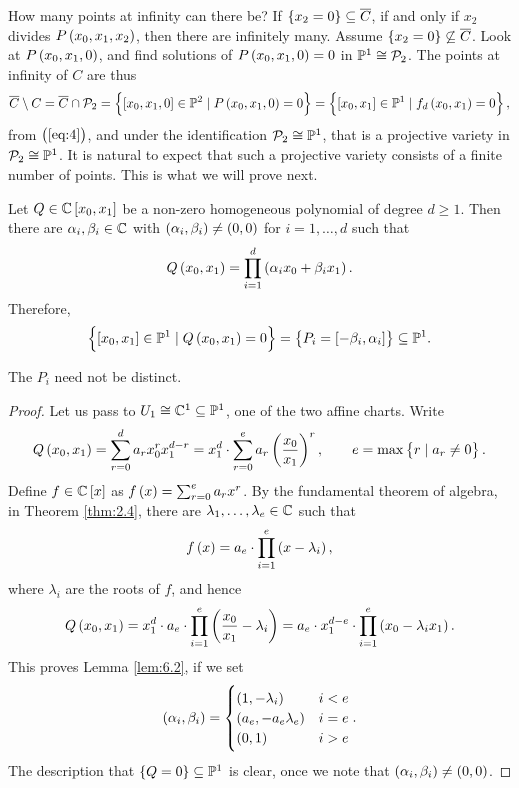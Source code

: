 How many points at infinity can there be? If $ \cbr{x_2 = 0} \subseteq \overline{C} $, if and only if $ x_2 $ divides $ P\br{x_0, x_1, x_2} $, then there are infinitely many. Assume $ \cbr{x_2 = 0} \not\subseteq \overline{C} $. Look at $ P\br{x_0, x_1, 0} $, and find solutions of $ P\br{x_0, x_1, 0} = 0 $ in $ \mathbb{P}^1 \cong \mathcal{P}_2 $. The points at infinity of $ C $ are thus
$$ \overline{C} \setminus C = \overline{C} \cap \PP_2 = \cbr{\sbr{x_0, x_1, 0} \in \P^2 \mid P\br{x_0, x_1, 0} = 0} = \cbr{\sbr{x_0, x_1} \in \P^1 \mid f_d\br{x_0, x_1} = 0}, $$
from $ \br{\ref{eq:4}} $, and under the identification $ \mathcal{P}_2 \cong \mathbb{P}^1 $, that is a projective variety in $ \mathcal{P}_2 \cong \mathbb{P}^1 $. It is natural to expect that such a projective variety consists of a finite number of points. This is what we will prove next.

\begin{lemma}
\label{lem:6.2}
Let $ Q \in \C\sbr{x_0, x_1} $ be a non-zero homogeneous polynomial of degree $ d \ge 1 $. Then there are $ \alpha_i, \beta_i \in \mathbb{C} $ with $ \br{\alpha_i, \beta_i} \ne \br{0, 0} $ for $ i = 1, \dots, d $ such that
$$ Q\br{x_0, x_1} = \prod_{i = 1}^d \br{\alpha_ix_0 + \beta_ix_1}. $$
Therefore,
$$ \cbr{\sbr{x_0, x_1} \in \P^1 \mid Q\br{x_0, x_1} = 0} = \cbr{P_i = \sbr{-\beta_i, \alpha_i}} \subseteq \P^1. $$
\end{lemma}

\begin{note*}
The $ P_i $ need not be distinct.
\end{note*}

\begin{proof}
Let us pass to $ U_1 \cong \mathbb{C}^1 \subseteq \mathbb{P}^1 $, one of the two affine charts. Write
$$ Q\br{x_0, x_1} = \sum_{r = 0}^d a_rx_0^rx_1^{d - r} = x_1^d \cdot \sum_{r = 0}^e a_r\br{\dfrac{x_0}{x_1}}^r, \qquad e = \max\cbr{r \mid a_r \ne 0}. $$
Define $ f \in \C\sbr{x} $ as $ f\br{x} = \sum_{r = 0}^e a_rx^r $. By the fundamental theorem of algebra, in Theorem \ref{thm:2.4}, there are $ \lambda_1, \dots, \lambda_e \in \mathbb{C} $ such that
$$ f\br{x} = a_e \cdot \prod_{i = 1}^e \br{x - \lambda_i}, $$
where $ \lambda_i $ are the roots of $ f $, and hence
$$ Q\br{x_0, x_1} = x_1^d \cdot a_e \cdot \prod_{i = 1}^e \br{\dfrac{x_0}{x_1} - \lambda_i} = a_e \cdot x_1^{d - e} \cdot \prod_{i = 1}^e \br{x_0 - \lambda_ix_1}. $$
This proves Lemma \ref{lem:6.2}, if we set
$$ \br{\alpha_i, \beta_i} =
\begin{cases}
\br{1, -\lambda_i} & i < e \\
\br{a_e, -a_e\lambda_e} & i = e \\
\br{0, 1} & i > e
\end{cases}.
$$
The description that $ \cbr{Q = 0} \subseteq \P^1 $ is clear, once we note that $ \br{\alpha_i, \beta_i} \ne \br{0, 0} $.
\end{proof}

